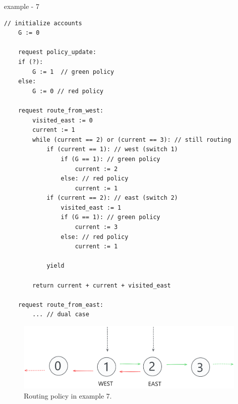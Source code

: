 \newpage

example - 7

\begin{minipage}[t]{1.0\textwidth}
	\begin{lstlisting}[caption={BGP (non serializable --- cycles can appear)}]
    // initialize accounts
    G := 0
    
    request policy_update:
    if (?):
        G := 1  // green policy 
    else:
        G := 0 // red policy
		
    request route_from_west:
        visited_east := 0
        current := 1
        while (current == 2) or (current == 3): // still routing        
            if (current == 1): // west (switch 1)
                if (G == 1): // green policy
                    current := 2
                else: // red policy
                    current := 1
            if (current == 2): // east (switch 2)
                visited_east := 1
                if (G == 1): // green policy
                    current := 3
                else: // red policy
                    current := 1
 
            yield
		
        return current + current + visited_east
        
    request route_from_east:
        ... // dual case     		        
	\end{lstlisting}
\end{minipage}



\begin{figure}[h]
	\centering
	\includegraphics[width=0.5\linewidth]{plots/east_west_routing.pdf}
	\caption{Routing policy in example 7.}
	\label{fig:pdfimage}
\end{figure}



\newpage


